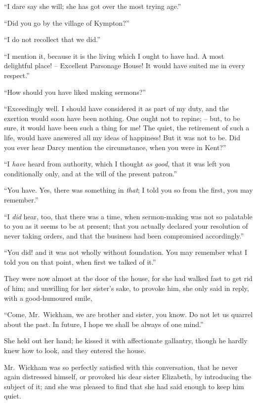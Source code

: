 “I dare say she will; she has got over the most trying
age.”

“Did you go by the village of Kympton?”

“I do not recollect that we did.”

“I mention it, because it is the living which I ought to
have had. A most delightful place! -- Excellent Parsonage
House! It would have suited me in every respect.”

“How should you have liked making sermons?”

“Exceedingly well. I should have considered it as part
of my duty, and the exertion would soon have been
nothing. One ought not to repine; -- but, to be sure, it
would have been such a thing for me! The quiet, the
retirement of such a life, would have answered all my
ideas of happiness! But it was not to be. Did you ever
hear Darcy mention the circumstance, when you were in
Kent?”

“I \textit{have} heard from authority, which I thought \textit{as good},
that it was left you conditionally only, and at the will
of the present patron.”

“You have. Yes, there was something in \textit{that}; I told
you so from the first, you may remember.”

“I \textit{did} hear, too, that there was a time, when sermon-making
was not so palatable to you as it seems to be at
present; that you actually declared your resolution of
never taking orders, and that the business had been
compromised accordingly.”

“You did! and it was not wholly without foundation.
You may remember what I told you on that point, when
first we talked of it.”

They were now almost at the door of the house, for
she had walked fast to get rid of him; and unwilling for
her sister’s sake, to provoke him, she only said in reply,
with a good-humoured smile,

“Come, Mr.\ Wickham, we are brother and sister, you
know. Do not let us quarrel about the past. In future,
I hope we shall be always of one mind.”

She held out her hand; he kissed it with affectionate
gallantry, though he hardly knew how to look, and they
entered the house.


Mr.\ Wickham was so perfectly satisfied with this conversation,
that he never again distressed himself, or
provoked his dear sister Elizabeth, by introducing the
subject of it; and she was pleased to find that she had
said enough to keep him quiet.

